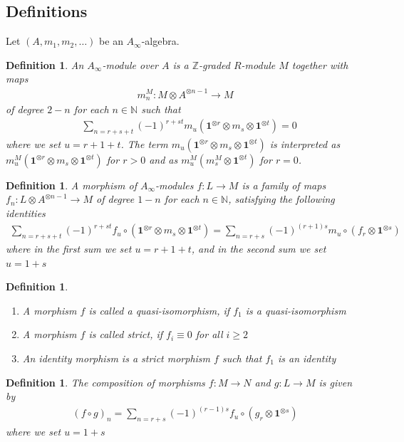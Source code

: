 \documentclass[a4paper, 12pt, openany, fleqn]{amsart}
\newtheorem{definition}[theorem]{Definition}
\begin{document}
\subsection{Definitions}
Let $(A,m_1,m_2,\dots)$ be an $A_\infty$-algebra.
\begin{definition}
    An $A_\infty$-module over $A$ is a $\mathbb{Z}$-graded $R$-module $M$ together with maps
    \begin{align*}
        m_n^M:M\otimes A^{\otimes n-1}\longrightarrow M
    \end{align*}
    of degree $2-n$ for each $n\in\mathbb{N}$ such that
    \begin{align*}
    &\sum_{n=r+s+t} (-1)^{r+st}m_u(\mathbf{1}^{\otimes r}\otimes m_s \otimes \mathbf{1}^{\otimes t}) = 0
\end{align*}
where we set $u=r+1+t$. The term $m_u(\mathbf{1}^{\otimes r}\otimes m_s\otimes\mathbf{1}^{\otimes t})$ is interpreted as $m_u^M(\mathbf{1}^{\otimes r}\otimes m_s\otimes\mathbf{1}^{\otimes t})$ for $r>0$ and as $m_u^M(m_s^M\otimes\mathbf{1}^{\otimes t})$ for $r=0$.
\end{definition}
\begin{definition}
    A morphism of $A_\infty$-modules $f:L\longrightarrow M$ is a family of maps $f_n:L\otimes A^{\otimes n-1}\longrightarrow M$ of degree $1-n$ for each $n\in\mathbb{N}$, satisfying the following identities
    \begin{align*}
        \sum_{n=r+s+t} (-1)^{r+st}f_u\circ (\mathbf{1}^{\otimes r}\otimes m_s\otimes\mathbf{1}^{\otimes t}) = \sum_{n=r+s} (-1)^{(r+1)s}m_u\circ (f_r \otimes \mathbf{1}^{\otimes s})
    \end{align*}
    where in the first sum we set $u=r+1+t$, and in the second sum we set $u=1+s$
\end{definition}
\begin{definition}
    \begin{enumerate}
    \item A morphism $f$ is called a quasi-isomorphism, if $f_1$ is a quasi-isomorphism
    \item A morphism $f$ is called strict, if $f_i \equiv 0$ for all $i\geq 2$
    \item An identity morphism is a strict morphism $f$ such that $f_1$ is an identity
\end{enumerate}
\end{definition}
\begin{definition}
    The composition of morphisms $f:M\longrightarrow N$ and $g:L\longrightarrow M$ is given by
    \begin{align*}
        (f\circ g)_n = \sum_{n=r+s} (-1)^{(r-1)s}f_u\circ(g_r\otimes\mathbf{1}^{\otimes s})
    \end{align*}
    where we set $u=1+s$
\end{definition}
\end{document}
